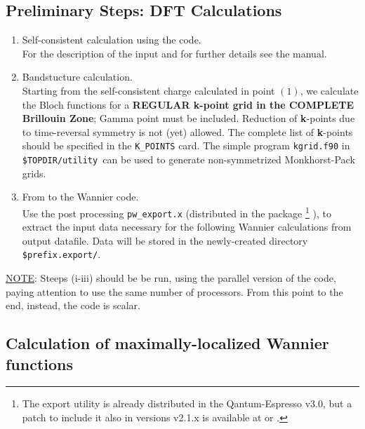 \subsection{Preliminary Steps: DFT
Calculations}\label{subsection:run_dft}
\renewcommand{\theenumi}{\roman{enumi}}
\renewcommand{\labelenumi}{\theenumi)}
\begin{enumerate}
%
\item Self-consistent calculation using the \PWSCF code.\\
      \noindent For the description of the input and for further details see the \PWSCF
      manual.
\item Bandstucture calculation.\\
      \noindent  Starting from the self-consistent charge
      calculated in point $(1)$, we calculate the Bloch functions for a
      {\bf REGULAR {\bf k}-point grid in the COMPLETE Brillouin Zone}; Gamma point
      must be included. Reduction of \textbf{k}-points due to time-reversal 
      symmetry is not (yet) allowed. The complete list of 
      \textbf{k}-points should be specified in the {\tt K\_POINTS} card. 
      The simple program
      {\tt kgrid.f90} in {\tt \$TOPDIR/utility }can be used to generate non-symmetrized 
      Monkhorst-Pack grids.
\item From \PWSCF to the Wannier code.\\
      \noindent Use the post processing
      {\tt pw\_export.x} (distributed in the \PWSCF package 
      \footnote{The export utility is already distributed in the 
      Qantum-Espresso v3.0, but a patch to include it also in versions v2.1.x is
      available at \WANTURL{} or \PWSCFURL{}.} 
      ),
      to extract the input data necessary for the following Wannier
      calculations
      from \PWSCF output datafile. Data will be stored in the
      newly-created directory {\tt \$prefix.export/}.
\end{enumerate}

\noindent \underline{NOTE}: Steeps (i-iii) should be be run, using the
parallel version of the code, paying attention to use the same
number of processors. From this point to the end, instead, the
code is scalar.

\subsection {Calculation of maximally-localized Wannier
functions}\label{subsection:run_wannier}

